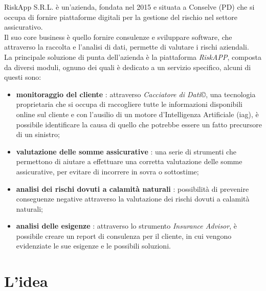 RiskApp S.R.L. è un'azienda, fondata nel 2015 e situata a Conselve (PD) che si occupa di fornire piattaforme digitali per la gestione del rischio nel settore assicurativo.\\
Il suo core business è quello fornire consulenze e sviluppare software, che attraverso la raccolta e l'analisi di dati, permette di valutare i rischi aziendali. \\
La principale soluzione di punta dell'azienda è la piattaforma \emph{RiskAPP}, composta da diversi moduli, ognuno dei quali è dedicato a un servizio specifico, alcuni di questi sono:
\begin{itemize}
    \item \textbf{monitoraggio del cliente} \cite{site:riskapp}: attraverso \emph{Cacciatore di Dati}\copyright, una tecnologia proprietaria che si occupa di raccogliere tutte le informazioni disponibili online sul cliente e con l'ausilio di un motore d'Intelligenza Artificiale (\gls{iag}\glsoccur), è possibile identificare la causa di quello che potrebbe essere un fatto precursore di un sinistro;
    \item \textbf{valutazione delle somme assicurative} \cite{site:riskapp}: una serie di strumenti che permettono di aiutare a effettuare una corretta valutazione delle somme assicurative, per evitare di incorrere in sovra o sottostime;
    \item \textbf{analisi dei rischi dovuti a calamità naturali} \cite{site:riskapp}: possibilità di prevenire conseguenze negative attraverso la valutazione dei rischi dovuti a calamità naturali;
    \item \textbf{analisi delle esigenze} \cite{site:riskapp}: attraverso lo strumento \emph{Insurance Advisor}, è possibile creare un report di consulenza per il cliente, in cui vengono evidenziate le sue esigenze e le possibili soluzioni.
\end{itemize}

\section{L'idea}
\label{sec:idea}

